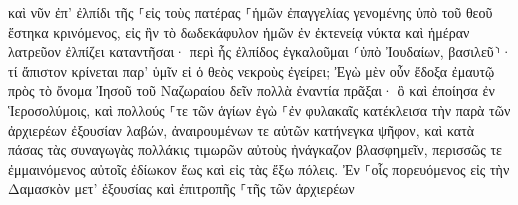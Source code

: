\documentclass{openreader}
\begin{document}
καὶ νῦν ἐπ’ ἐλπίδι τῆς ⸀εἰς τοὺς πατέρας ⸀ἡμῶν ἐπαγγελίας γενομένης ὑπὸ τοῦ θεοῦ ἕστηκα κρινόμενος, 
εἰς ἣν τὸ δωδεκάφυλον ἡμῶν ἐν ἐκτενείᾳ νύκτα καὶ ἡμέραν λατρεῦον ἐλπίζει καταντῆσαι· περὶ ἧς ἐλπίδος ἐγκαλοῦμαι ⸂ὑπὸ Ἰουδαίων, βασιλεῦ⸃· 
τί ἄπιστον κρίνεται παρ’ ὑμῖν εἰ ὁ θεὸς νεκροὺς ἐγείρει; 
Ἐγὼ μὲν οὖν ἔδοξα ἐμαυτῷ πρὸς τὸ ὄνομα Ἰησοῦ τοῦ Ναζωραίου δεῖν πολλὰ ἐναντία πρᾶξαι· 
ὃ καὶ ἐποίησα ἐν Ἱεροσολύμοις, καὶ πολλούς ⸀τε τῶν ἁγίων ἐγὼ ⸀ἐν φυλακαῖς κατέκλεισα τὴν παρὰ τῶν ἀρχιερέων ἐξουσίαν λαβών, ἀναιρουμένων τε αὐτῶν κατήνεγκα ψῆφον, 
καὶ κατὰ πάσας τὰς συναγωγὰς πολλάκις τιμωρῶν αὐτοὺς ἠνάγκαζον βλασφημεῖν, περισσῶς τε ἐμμαινόμενος αὐτοῖς ἐδίωκον ἕως καὶ εἰς τὰς ἔξω πόλεις. 
Ἐν ⸀οἷς πορευόμενος εἰς τὴν Δαμασκὸν μετ’ ἐξουσίας καὶ ἐπιτροπῆς ⸀τῆς τῶν ἀρχιερέων 
\end{document}
